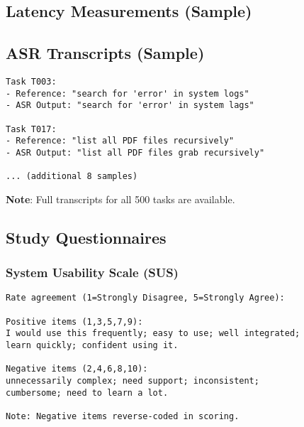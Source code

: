 \documentclass[a4paper,12pt]{article}
\begin{document}
\subsection*{Latency Measurements (Sample)}
\begin{table}[h!]
\centering
{}
\caption{Sample of 10 latency measurements from the study (full dataset available in supplementary materials).}
\end{table}

\subsection*{ASR Transcripts (Sample)}
\begin{verbatim}
Task T003: 
- Reference: "search for 'error' in system logs"
- ASR Output: "search for 'error' in system lags"

Task T017: 
- Reference: "list all PDF files recursively"
- ASR Output: "list all PDF files grab recursively"

... (additional 8 samples)
\end{verbatim}
\noindent \textbf{Note}: Full transcripts for all 500 tasks are available.

\subsection*{Study Questionnaires}
\subsubsection*{System Usability Scale (SUS)}
\begin{verbatim}
Rate agreement (1=Strongly Disagree, 5=Strongly Agree):

Positive items (1,3,5,7,9): 
I would use this frequently; easy to use; well integrated; 
learn quickly; confident using it.

Negative items (2,4,6,8,10): 
unnecessarily complex; need support; inconsistent; 
cumbersome; need to learn a lot.

Note: Negative items reverse-coded in scoring.
\end{verbatim}
\end{document}
